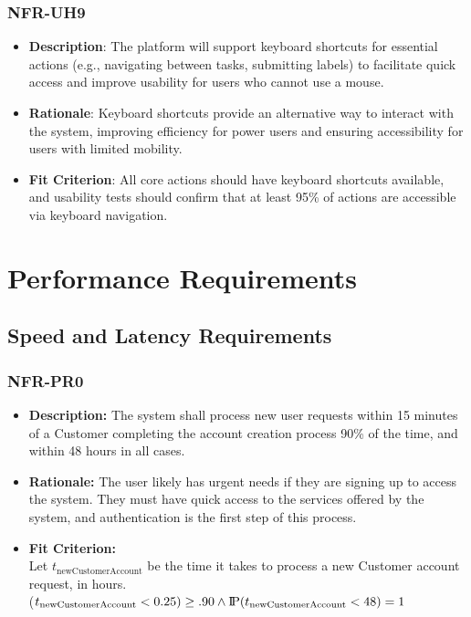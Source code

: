 \documentclass[12pt]{article}
\newcommand{\probP}{\text{I\kern-0.15em P}}
\begin{document}
        \subsubsection*{NFR-UH9} 
        \begin{itemize} 
            \item \textbf{Description}: The platform will support keyboard shortcuts for essential actions (e.g., navigating between tasks, submitting labels) to facilitate quick access and improve usability for users who cannot use a mouse.  
            \item \textbf{Rationale}: Keyboard shortcuts provide an alternative way to interact with the system, improving efficiency for power users and ensuring accessibility for users with limited mobility.  
            \item \textbf{Fit Criterion}: All core actions should have keyboard shortcuts available, and usability tests should confirm that at least 95\% of actions are accessible via keyboard navigation.
        \end{itemize}



\section{Performance Requirements}
\subsection{Speed and Latency Requirements}
\subsubsection*{NFR-PR0}
\begin{itemize}
  \item \textbf{Description:} The system shall process new user requests within 15 minutes of a Customer completing the account creation process 90\% of the time, and within 48 hours in all cases. 
  \item \textbf{Rationale:} The user likely has urgent needs if they are signing up to access the system. They must have quick access to the services offered by the system, and authentication is the first step of this process.
  \item \textbf{Fit Criterion:}\\ Let $t_{\text{newCustomerAccount}}$ be the time it takes to process a new Customer account request, in hours.\\ \probP($t_{\text{newCustomerAccount}} < 0.25) \geq .90 \wedge \probP(t_{\text{newCustomerAccount}} < 48) = 1 $
\end{itemize}
\end{document}
